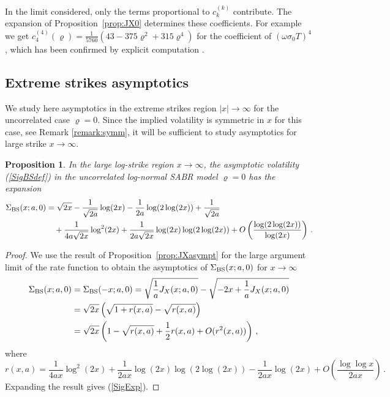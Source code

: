 \documentclass[11pt]{article}
\numberwithin{equation}{section}
\theoremstyle{plain}
\newtheorem{proposition}[theorem]{Proposition}
\begin{document}
In the limit considered,
only the terms proportional to $c_k^{(k)}$ contribute. The expansion of
Proposition~\ref{prop:JX0} determines these coefficients.
For example we get $c_{4}^{(4)}(\varrho)= \frac{1}{5760}(43-375\varrho^2+315\varrho^4)$ 
for the coefficient of $(\omega \sigma_0 T)^4$, which has been confirmed 
by explicit computation \cite{LewisUnpublished}.






\subsection{Extreme strikes asymptotics}
\label{sec:6.4}

We study here asymptotics in the extreme strikes region $|x| \to \infty$
for the uncorrelated case $\varrho=0$.
Since the implied volatility is symmetric in $x$ for this case, 
see Remark \ref{remark:symm}, 
it will be sufficient to study asymptotics for large strike $x\to \infty$.

\begin{proposition}
In the large log-strike region $x\to \infty$, the asymptotic
volatility (\ref{SigBSdef}) in  the uncorrelated log-normal SABR model
$\varrho=0$ has the expansion
\begin{align}\label{SigExp}
\Sigma_{\rm BS}(x;a,0) 
&= \sqrt{2x} - \frac{1}{\sqrt{2a}} \log (2x) - \frac{1}{2a}
\log(2 \log(2x)) + \frac{1}{\sqrt{2a}}
\\
& \quad + \frac{1}{4a\sqrt{2x}} \log^2 (2x) + \frac{1}{2a\sqrt{2x}} 
\log(2x) \log(2\log(2x)) + 
O\left(\frac{\log(2\log(2x))}{\log(2x)}\right)
\nonumber \,.
\end{align}
\end{proposition}

\begin{proof}
We use the result of Proposition~\ref{prop:JXasympt} for the large argument
limit of the rate function to obtain the asymptotics of $\Sigma_{\rm BS}(x;a,0)$
for $x \to \infty$
\begin{align}
\Sigma_{\rm BS}(x;a,0) 
&= \Sigma_{\rm BS}(-x;a,0) = 
\sqrt{\frac{1}{a} J_X(x;a,0)} - \sqrt{-2x + \frac{1}{a} J_X(x;a,0)}
 \\
&= \sqrt{2x}\left( \sqrt{1 + r(x,a)} - \sqrt{r(x,a)} \right)
\nonumber
\\
&= \sqrt{2x} \left( 1 - \sqrt{r(x,a)} + \frac12 r(x,a)
+ O(r^2(x,a)) \right)\,, \nonumber
\end{align}
where
\begin{equation}
r(x,a) = \frac{1}{4ax} \log^2(2x) + \frac{1}{2ax} \log(2x) \log(2 \log(2x))
- \frac{1}{2ax} \log(2x) + O\left(\frac{\log\log x}{2ax}\right)\,.
\end{equation}
Expanding the result gives (\ref{SigExp}).
\end{proof}
\end{document}
